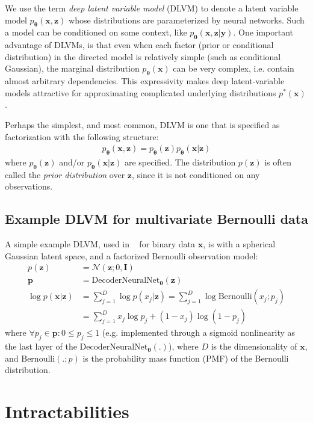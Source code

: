 \documentclass[MAL,biber]{nowfnt} %
\newcommand{\bb}[1]{\mathbf{#1}}
\newcommand{\bx}{\bb{x}}
\newcommand{\by}{\bb{y}}
\newcommand{\bp}{\bb{p}}
\newcommand{\bz}{\bb{z}}
\newcommand{\bT}{\boldsymbol{\theta}}
\newcommand{\bI}{\bb{I}}
\newcommand{\pT}{p_{\bT}}
\newcommand{\DecoderNeuralNet}{\text{DecoderNeuralNet}_{\bT}}
\begin{document}
We use the term \emph{deep latent variable model} (DLVM) to denote a latent variable model $\pT(\bx,\bz)$ whose distributions are parameterized by neural networks. Such a model can be conditioned on some context, like $\pT(\bx,\bz|\by)$. One important advantage of DLVMs, is that even when each factor (prior or conditional distribution) in the directed model is relatively simple (such as conditional Gaussian), the marginal distribution $\pT(\bx)$ can be very complex, i.e. contain almost arbitrary dependencies. This expressivity makes deep latent-variable models attractive for approximating complicated underlying distributions $p^*(\bx)$.

Perhaps the simplest, and most common, DLVM is one that is specified as factorization with the following structure:
\begin{align}
\pT(\bx,\bz) = \pT(\bz) \pT(\bx|\bz)
\end{align}
where $\pT(\bz)$ and/or $\pT(\bx|\bz)$ are specified. The distribution $p(\bz)$ is often called the \emph{prior distribution} over $\bz$, since it is not conditioned on any observations.

\subsection{Example DLVM for multivariate Bernoulli data}

A simple example DLVM, used in ~\citep{kingma2013auto} for binary data $\bx$, is with a spherical Gaussian latent space, and a factorized Bernoulli observation model:
\begin{align}
p(\bz) &= \mathcal{N}(\bz; 0,\bI)\\
\mathbf{p} &= \DecoderNeuralNet(\bz)\\
\log p(\bx|\bz) &=  \sum_{j=1}^D \log p(x_j|\bz) = \sum_{j=1}^D \log \text{Bernoulli}(x_j; p_j)\\
&= \sum_{j=1}^D x_j \log p_j + (1-x_j) \log (1-p_j)
\end{align}
where $\forall p_j \in \bp: 0 \leq p_j \leq 1$ (e.g. implemented through a sigmoid nonlinearity as the last layer of the $\DecoderNeuralNet(.)$), where $D$ is the dimensionality of $\bx$, and $\text{Bernoulli}(.;p)$ is the probability mass function (PMF) of the Bernoulli distribution.

\section{Intractabilities}
\end{document}
